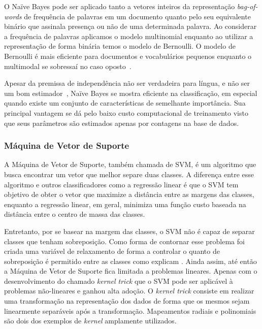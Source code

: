O Naïve Bayes pode ser aplicado tanto a vetores inteiros da representação
\textit{bag-of-words} de frequência de palavras em um documento quanto pelo seu
equivalente binário que assinala presença ou não de uma determinada palavra.
Ao considerar a frequência de palavras aplicamos o modelo multinomial enquanto
ao utilizar a representação de forma binária temos o modelo de Bernoulli.
O modelo de Bernoulli é mais eficiente para documentos e vocabulários pequenos
enquanto o multimodal se sobressaí no caso oposto~\cite{schutze08}.

Apesar da premissa de independência não ser verdadeira para língua, e não ser um
bom estimador~\cite{schutze08}, Naïve Bayes se mostra eficiente na
classificação, em especial quando existe um conjunto de características de
semelhante importância.
Sua principal vantagem se dá pelo baixo custo computacional de treinamento visto
que seus parâmetros são estimados apenas por contagens na base de dados.

\subsubsection{Máquina de Vetor de Suporte}
\label{sec:svm}

A Máquina de Vetor de Suporte, também chamada de SVM, é um algoritmo que busca
encontrar um vetor que melhor separe duas classes.
A diferença entre esse algoritmo e outros classificadores como a regressão
linear é que o SVM tem objetivo de obter o vetor que maximize a distância entre
as margens das classes, enquanto a regressão linear, em geral, minimiza uma
função custo baseada na distância entre o centro de massa das classes.

Entretanto, por se basear na margem das classes, o SVM não é capaz de separar
classes que tenham sobreposição.
Como forma de contornar esse problema foi criada uma variável de relaxamento de
forma a controlar o quanto de sobreposição é permitido entre as classes como
explicam \citet{cortes95}.
Ainda assim, até então a Máquina de Vetor de Suporte fica limitada a problemas
lineares.
Apenas com o desenvolvimento do chamado \textit{kernel trick} que o SVM pode ser
aplicável à problemas não-lineares e ganhou alta adoção.
O \textit{kernel trick} consiste em realizar uma transformação na representação
dos dados de forma que os mesmos sejam linearmente separáveis após a
transformação.
Mapeamentos radiais e polinomiais são dois dos exemplos de \textit{kernel}
amplamente utilizados.

